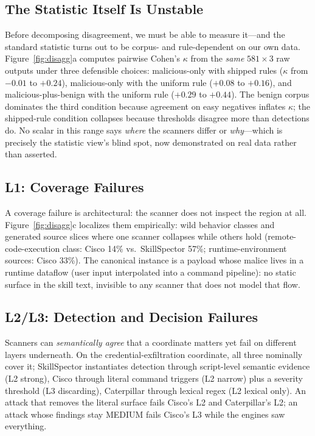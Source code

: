 \documentclass[sigconf,nonacm]{acmart}
\begin{document}
\subsection{The Statistic Itself Is Unstable}
Before decomposing disagreement, we must be able to measure it---and the standard statistic turns out to be corpus- and rule-dependent on our own data. Figure~\ref{fig:disagg}a computes pairwise Cohen's $\kappa$ from the \emph{same} $581\times3$ raw outputs under three defensible choices: malicious-only with shipped rules ($\kappa$ from $-0.01$ to $+0.24$), malicious-only with the uniform rule ($+0.08$ to $+0.16$), and malicious-plus-benign with the uniform rule ($+0.29$ to $+0.44$). The benign corpus dominates the third condition because agreement on easy negatives inflates $\kappa$; the shipped-rule condition collapses because thresholds disagree more than detections do. No scalar in this range says \emph{where} the scanners differ or \emph{why}---which is precisely the statistic view's blind spot, now demonstrated on real data rather than asserted.

\subsection{L1: Coverage Failures}
A coverage failure is architectural: the scanner does not inspect the region at all. Figure~\ref{fig:disagg}c localizes them empirically: wild behavior classes and generated source slices where one scanner collapses while others hold (remote-code-execution class: Cisco 14\% vs.\ SkillSpector 57\%; runtime-environment sources: Cisco 33\%). The canonical instance is a payload whose malice lives in a runtime dataflow (user input interpolated into a command pipeline): no static surface in the skill text, invisible to any scanner that does not model that flow.

\subsection{L2/L3: Detection and Decision Failures}
Scanners can \emph{semantically agree} that a coordinate matters yet fail on different layers underneath. On the credential-exfiltration coordinate, all three nominally cover it; SkillSpector instantiates detection through script-level semantic evidence (L2 strong), Cisco through literal command triggers (L2 narrow) plus a severity threshold (L3 discarding), Caterpillar through lexical regex (L2 lexical only). An attack that removes the literal surface fails Cisco's L2 and Caterpillar's L2; an attack whose findings stay MEDIUM fails Cisco's L3 while the engines saw everything.
\end{document}
